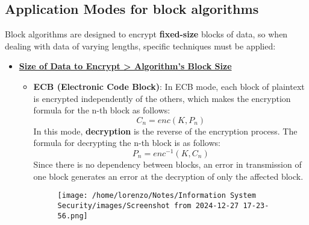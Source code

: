 \subsection{Application Modes for block algorithms}
Block algorithms are designed to encrypt \textbf{fixed-size} blocks of data, so when dealing with data of varying lengths, specific techniques must be applied:
\begin{itemize}
    \item \underline{\textbf{Size of Data to Encrypt > Algorithm's Block Size}}
    \begin{itemize}
        \item \textbf{ECB (Electronic Code Block)}: In ECB mode, each block of plaintext is encrypted independently of the others, which makes the encryption formula for the n-th block as follows:
        \[C_n=enc(K,P_n)\]
        In this mode, \textbf{decryption} is the reverse of the encryption process. The formula for decrypting the n-th block is as follows:
        \[P_n=enc^{-1}(K,C_n)\]
        Since there is no dependency between blocks, an error in transmission of one block generates an error at the decryption of only the affected block.
        \begin{figure}[H]
            \centering
            \texttt{[image: /home/lorenzo/Notes/Information System Security/images/Screenshot from 2024-12-27 17-23-56.png]}
        \end{figure}


\end{itemize}
\end{itemize}
